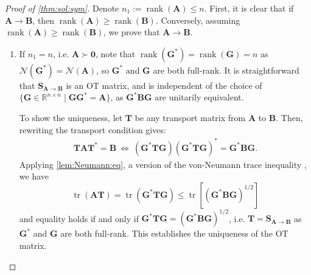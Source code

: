 \documentclass[noinfoline]{imsart}\setcounter{tocdepth}{2}
\renewcommand{\b}[1]{\mathbb{#1}} %
\newcommand{\m}[1]{\mathbf{#1}} %
\renewcommand{\c}[1]{\mathcal{#1}} %
\DeclareMathOperator*{\tr}{tr}
\DeclareMathOperator*{\rk}{rank}
\theoremstyle{plain}
\begin{document}
\begin{proof}[Proof of \cref{thm:sol:sym}]
Denote $n_{1} := \rk (\m{A}) \le n$. First, it is clear that if $\m{A} \rightarrow \m{B}$, then $\rk (\m{A}) \ge \rk (\m{B})$. Conversely, assuming $\rk (\m{A}) \ge \rk (\m{B})$, we prove that $\m{A} \rightarrow \m{B}$.

\begin{enumerate}[leftmargin=*]
\item If $n_{1} = n$, i.e. $\m{A} \succ \m{0}$, note that $\rk (\m{G}^{*}) = \rk (\m{G}) = n$ as $\c{N}(\m{G}^{*}) = \c{N}(\m{A})$, so $\m{G}^{*}$ and $\m{G}$ are both full-rank. It is straightforward that $\m{S}_{\m{A} \to \m{B}}$ is an OT matrix, and is independent of the choice of $\{\m{G} \in \b{R}^{n \times n}  \mid \m{G} \m{G}^{*} = \m{A} \}$, as $\m{G}^{*} \m{B} \m{G}$ are unitarily equivalent.

To show the uniqueness, let $\m{T}$ be any transport matrix from $\m{A}$ to $\m{B}$. Then, rewriting the transport condition gives:
\begin{align*}
    \m{T} \m{A} \m{T}^{*} = \m{B} \ \Leftrightarrow \ (\m{G}^{*} \m{T} \m{G}) (\m{G}^{*} \m{T} \m{G})^{*} = \m{G}^{*} \m{B} \m{G}.
\end{align*}
Applying \cref{lem:Neumann:eq}, a version of the von-Neumann trace inequality \cite{horn2012matrix}, we have
\begin{equation*}
    \tr (\m{A} \m{T}) = \tr (\m{G}^{*} \m{T} \m{G}) \le \tr [(\m{G}^{*} \m{B} \m{G})^{1/2}]
\end{equation*}
and equality holds if and only if $\m{G}^{*} \m{T} \m{G} = (\m{G}^{*} \m{B} \m{G})^{1/2}$, i.e. $\m{T} = \m{S}_{\m{A} \to \m{B}}$ as $\m{G}^{*}$ and $\m{G}$ are both full-rank. This establishes the uniqueness of the OT matrix.


\end{enumerate}
\end{proof}
\end{document}

